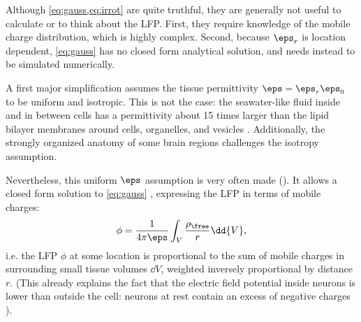 Although \cref{eq:gauss,eq:irrot} are quite truthful, they are generally not useful to calculate or to think about the LFP. First, they require knowledge of the mobile charge distribution, which is highly complex.\footnotemark{} Second, because $\eps_r$ is location dependent, \cref{eq:gauss} has no closed form analytical solution, and needs instead to be simulated numerically.


A first major simplification assumes the tissue permittivity $\eps = \eps_r \eps_0$ to be uniform and isotropic. This is not the case: the seawater-like fluid inside and in between cells has a permittivity about 15 times larger than the lipid bilayer membranes around cells, organelles, and vesicles \cite{Marszalek1991,Weaver2003,Martinsen2015}. Additionally, the strongly organized anatomy of some brain regions challenges the isotropy assumption.

Nevertheless, this uniform $\eps$ assumption is very often made (\cite{Nunez2006,Plonsey2007}). It allows a closed form solution to \cref{eq:gauss} \cite{Feynman2013}, expressing the LFP in terms of mobile charges:
%
\begin{equation}
\phi = \frac{1}{4 \pi \eps} \int_V \frac{\rho_\free}{r} \dd{V},
\end{equation}
%
i.e. the LFP $\phi$ at some location is proportional to the sum of mobile charges in surrounding small tissue volumes $\dd{V}$, weighted inversely proportional by distance $r$. (This already explains the fact that the electric field potential inside neurons is lower than outside the cell: neurons at rest contain an excess of negative charges \cite{Dayan2001b}).


